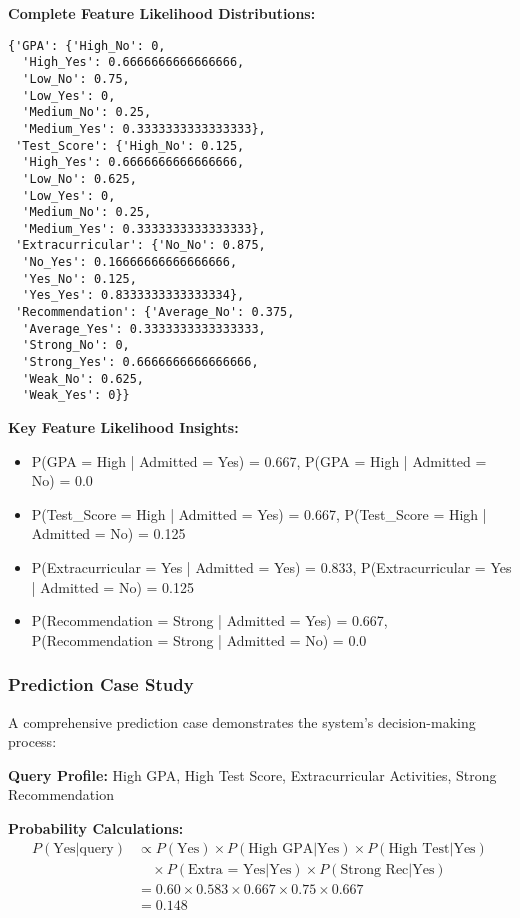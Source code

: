 \documentclass[11pt,a4paper]{article}
\begin{document}
\textbf{Complete Feature Likelihood Distributions:}
\begin{lstlisting}[caption=All Learned Feature Likelihoods]
{'GPA': {'High_No': 0,
  'High_Yes': 0.6666666666666666,
  'Low_No': 0.75,
  'Low_Yes': 0,
  'Medium_No': 0.25,
  'Medium_Yes': 0.3333333333333333},
 'Test_Score': {'High_No': 0.125,
  'High_Yes': 0.6666666666666666,
  'Low_No': 0.625,
  'Low_Yes': 0,
  'Medium_No': 0.25,
  'Medium_Yes': 0.3333333333333333},
 'Extracurricular': {'No_No': 0.875,
  'No_Yes': 0.16666666666666666,
  'Yes_No': 0.125,
  'Yes_Yes': 0.8333333333333334},
 'Recommendation': {'Average_No': 0.375,
  'Average_Yes': 0.3333333333333333,
  'Strong_No': 0,
  'Strong_Yes': 0.6666666666666666,
  'Weak_No': 0.625,
  'Weak_Yes': 0}}
\end{lstlisting}

\textbf{Key Feature Likelihood Insights:}
\begin{itemize}
    \item P(GPA = High | Admitted = Yes) = 0.667, P(GPA = High | Admitted = No) = 0.0
    \item P(Test\_Score = High | Admitted = Yes) = 0.667, P(Test\_Score = High | Admitted = No) = 0.125
    \item P(Extracurricular = Yes | Admitted = Yes) = 0.833, P(Extracurricular = Yes | Admitted = No) = 0.125
    \item P(Recommendation = Strong | Admitted = Yes) = 0.667, P(Recommendation = Strong | Admitted = No) = 0.0
\end{itemize}

\subsubsection{Prediction Case Study}

A comprehensive prediction case demonstrates the system's decision-making process:

\textbf{Query Profile:} High GPA, High Test Score, Extracurricular Activities, Strong Recommendation

\textbf{Probability Calculations:}
\begin{align}
P(\text{Yes}|\text{query}) &\propto P(\text{Yes}) \times P(\text{High GPA}|\text{Yes}) \times P(\text{High Test}|\text{Yes}) \\
&\quad \times P(\text{Extra = Yes}|\text{Yes}) \times P(\text{Strong Rec}|\text{Yes}) \\
&= 0.60 \times 0.583 \times 0.667 \times 0.75 \times 0.667 \\
&= 0.148
\end{align}
\end{document}
